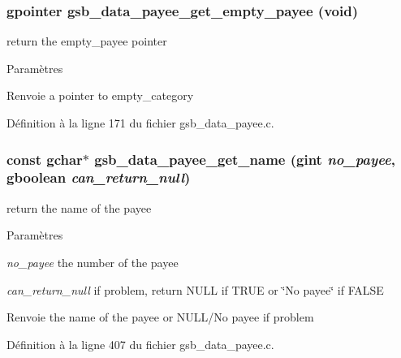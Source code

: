 \subsubsection[{gsb\_\-data\_\-payee\_\-get\_\-empty\_\-payee}]{\setlength{\rightskip}{0pt plus 5cm}gpointer gsb\_\-data\_\-payee\_\-get\_\-empty\_\-payee (void)}\label{gsb__data__payee_8h_a9127e3118fee2249a31d1139e4cff6f1}
return the empty\_\-payee pointer


\begin{DoxyParams}{Paramètres}
\item[{\em }]\end{DoxyParams}
\begin{DoxyReturn}{Renvoie}
a pointer to empty\_\-category 
\end{DoxyReturn}


Définition à la ligne 171 du fichier gsb\_\-data\_\-payee.c.

\subsubsection[{gsb\_\-data\_\-payee\_\-get\_\-name}]{\setlength{\rightskip}{0pt plus 5cm}const gchar$\ast$ gsb\_\-data\_\-payee\_\-get\_\-name (gint {\em no\_\-payee}, \/  gboolean {\em can\_\-return\_\-null})}\label{gsb__data__payee_8h_adc6080b7376628d3902f5fd861deb45a}
return the name of the payee


\begin{DoxyParams}{Paramètres}
\item[{\em no\_\-payee}]the number of the payee \item[{\em can\_\-return\_\-null}]if problem, return NULL if TRUE or \char`\"{}No payee\char`\"{} if FALSE\end{DoxyParams}
\begin{DoxyReturn}{Renvoie}
the name of the payee or NULL/No payee if problem 
\end{DoxyReturn}


Définition à la ligne 407 du fichier gsb\_\-data\_\-payee.c.

